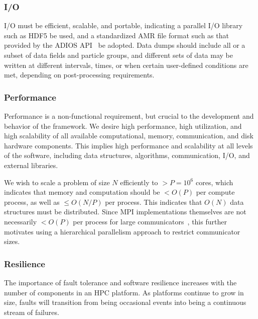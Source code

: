 \documentclass[10pt,twocolumn]{article}
\begin{document}
\subsubsection{I/O } \label{sss:require-io}

I/O must be efficient, scalable, and portable, indicating a parallel
I/O library such as HDF5 be used, and a standardized AMR file format
such as that provided by the ADIOS API~\cite{LoKl08} be adopted.  Data
dumps should include all or a subset of data fields and particle
groups, and different sets of data may be written at different
intervals, times, or when certain user-defined conditions are met,
depending on post-processing requirements.

\subsubsection{Performance}  \label{sss:require-performance}

Performance is a non-functional requirement, but crucial to the
development and behavior of the framework.  We desire high
performance, high utilization, and high scalability of all available
computational, memory, communication, and disk hardware components.
This implies high performance and scalability at all levels of the
software, including data structures, algorithms, communication, I/O,
and external libraries.

We wish to scale a problem of size $N$ efficiently to $> P = 10^6$
cores, which indicates that memory and computation should be $< O(P)$
per compute process, as well as $\leq O(N/P)$ per process.  This
indicates that $O(N)$ data structures must be distributed.  Since MPI
implementations themselves are not necessarily $< O(P)$ per process
for large communicators~\cite{BaBu09}, this further motivates using a
hierarchical parallelism approach to restrict communicator sizes.

\subsubsection{Resilience} \label{sss:require-resilience}

The importance of fault tolerance and software resilience increases
with the number of components in an HPC platform.  As platforms
continue to grow in size, faults will transition from being occasional
events into being a continuous stream of failures.
\end{document}
